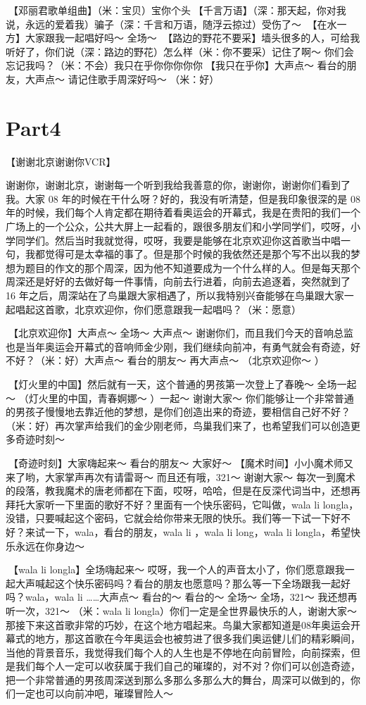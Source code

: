 \documentclass[
]{book}
\begin{document}
🎵【邓丽君歌单组曲】（米：宝贝）宝你个头🎵【千言万语】（深：那天起，你对我说，永远的爱着我）骗子（深：千言和万语，随浮云掠过）受伤了～ 🎵【在水一方】大家跟我一起唱好吗～ 全场～ 🎵【路边的野花不要采】墙头很多的人，可给我听好了，你们说（深：路边的野花）怎么样（米：你不要采）记住了啊～ 你们会忘记我吗？（米：不会）我只在乎你你你你你🎵【我只在乎你】大声点～ 看台的朋友，大声点～ 请记住歌手周深好吗～ （米：好）

\section{Part4}\label{beijing-20240922-part4}

【谢谢北京谢谢你VCR】

谢谢你，谢谢北京，谢谢每一个听到我给我善意的你，谢谢你，谢谢你们看到了我。大家 08 年的时候在干什么呀？好的，我没有听清楚，但是我印象很深的是 08 年的时候，我们每个人肯定都在期待着看奥运会的开幕式，我是在贵阳的我们一个广场上的一个公众，公共大屏上一起看的，跟很多朋友们和小学同学们，哎呀，小学同学们。然后当时我就觉得，哎呀，我要是能够在北京欢迎你这首歌当中唱一句，我都觉得可是太幸福的事了。但是那个时候的我依然还是那个写不出以我的梦想为题目的作文的那个周深，因为他不知道要成为一个什么样的人。但是每天那个周深还是好好的去做好每一件事情，向前去行进着，向前去追逐着，突然就到了 16 年之后，周深站在了鸟巢跟大家相遇了，所以我特别兴奋能够在鸟巢跟大家一起唱起这首歌，北京欢迎你，你们愿意跟我一起唱吗？（米：愿意）

🎵【北京欢迎你】大声点～ 全场～ 大声点～ 谢谢你们，而且我们今天的音响总监也是当年奥运会开幕式的音响师金少刚，我们继续向前冲，有勇气就会有奇迹，好不好？（米：好）大声点～ 看台的朋友～ 再大声点～ （北京欢迎你～ ）

🎵【灯火里的中国】然后就有一天，这个普通的男孩第一次登上了春晚～ 全场一起～ （灯火里的中国，青春婀娜～ ）一起～ 谢谢大家～
你们能够让一个非常普通的男孩子慢慢地去靠近他的梦想，是你们创造出来的奇迹，要相信自己好不好？（米：好）再次掌声给我们的金少刚老师，鸟巢我们来了，也希望我们可以创造更多奇迹时刻～

🎵【奇迹时刻】大家嗨起来～ 看台的朋友～ 大家好～ 【魔术时间】小小魔术师又来了哟，大家掌声再次有请雷哥～ 而且还有哦，321～ 谢谢大家～
每次一到魔术的段落，教我魔术的唐老师都在下面，哎呀，哈哈，但是在反深代词当中，还想再拜托大家听一下里面的歌好不好？里面有一个快乐密码，它叫做，wala li longla，没错，只要喊起这个密码，它就会给你带来无限的快乐。我们等一下试一下好不好？来试一下，wala，看台的朋友，wala li ，wala li long，wala li longla，希望快乐永远在你身边～

🎵【wala li longla】全场嗨起来～ 哎呀，我一个人的声音太小了，你们愿意跟我一起大声喊起这个快乐密码吗？看台的朋友也愿意吗？那么等一下全场跟我一起好吗？wala，wala li \ldots\ldots 大声点～ 看台的～ 看台的～ 全场～ 全场，321～ 我还想再听一次，321～ （米：wala li longla）你们一定是全世界最快乐的人，谢谢大家～
那接下来这首歌非常的巧妙，在这个地方唱起来。鸟巢大家都知道是08年奥运会开幕式的地方，那这首歌在今年奥运会也被剪进了很多我们奥运健儿们的精彩瞬间，当他的背景音乐，我觉得我们每个人的人生也是不停地在向前冒险，向前探索，但是我们每个人一定可以收获属于我们自己的璀璨的，对不对？你们可以创造奇迹，把一个非常普通的男孩周深送到那么多那么多那么大的舞台，周深可以做到的，你们一定也可以向前冲吧，璀璨冒险人～
\end{document}
